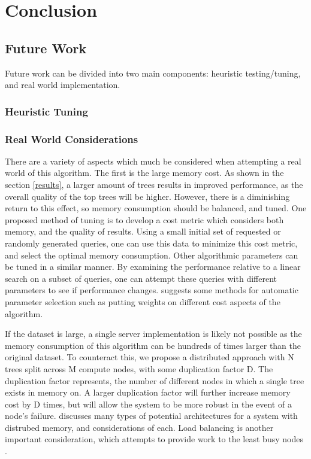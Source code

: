 \chapter{Conclusion} %

\label{conclusion} %


\section{Future Work}

Future work can be divided into two main components: heuristic testing/tuning, and real world implementation.

\subsection{Heuristic Tuning}

\subsection{Real World Considerations}

There are a variety of aspects which much be considered when attempting a real world of this algorithm.  The first is the large memory cost.  As shown in the section \ref{results}, a larger amount of trees results in improved performance, as the overall quality of the top trees will be higher.  However, there is a diminishing return to this effect, so memory consumption should be balanced, and tuned.  One proposed method of tuning is to develop a cost metric which considers both memory, and the quality of results.  Using a small initial set of requested or randomly generated queries, one can use this data to minimize this cost metric, and select the optimal memory consumption.  Other algorithmic parameters can be tuned in a similar manner.  By examining the performance relative to a linear search on a subset of queries, one can attempt these queries with different parameters to see if performance changes.  \citep{muja_flann_2009} suggests some methods for automatic parameter selection such as putting weights on different cost aspects of the algorithm.

If the dataset is large, a single server implementation is likely not possible as the memory consumption of this algorithm can be hundreds of times larger than the original dataset.  To counteract this, we propose a distributed approach with N trees split across M compute nodes, with some duplication factor D.  The duplication factor represents, the number of different nodes in which a single tree exists in memory on.  A larger duplication factor will further increase memory cost by D times, but will allow the system to be more robust in the event of a node's failure.  \citep{nitzberg1991distributed} discusses many types of potential architectures for a system with distrubed memory, and considerations of each.  Load balancing is another important consideration, which attempts to provide work to the least busy nodes \citep{cybenko1989dynamic}.

